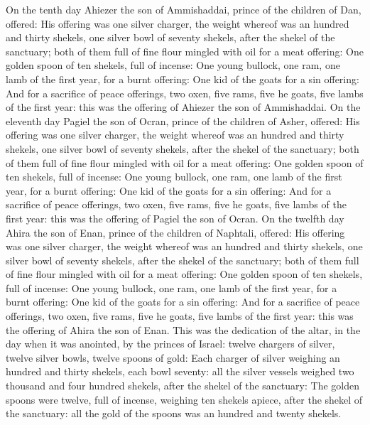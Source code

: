 \begin{biblechapter}
\verse On the tenth day Ahiezer the son of Ammishaddai, prince of the children of Dan, offered:
\verse His offering was one silver charger, the weight whereof was an hundred and thirty shekels, one silver bowl of seventy shekels, after the shekel of the sanctuary; both of them full of fine flour mingled with oil for a meat offering:
\verse One golden spoon of ten shekels, full of incense:
\verse One young bullock, one ram, one lamb of the first year, for a burnt offering:
\verse One kid of the goats for a sin offering:
\verse And for a sacrifice of peace offerings, two oxen, five rams, five he goats, five lambs of the first year: this was the offering of Ahiezer the son of Ammishaddai.
\verse On the eleventh day Pagiel the son of Ocran, prince of the children of Asher, offered:
\verse His offering was one silver charger, the weight whereof was an hundred and thirty shekels, one silver bowl of seventy shekels, after the shekel of the sanctuary; both of them full of fine flour mingled with oil for a meat offering:
\verse One golden spoon of ten shekels, full of incense:
\verse One young bullock, one ram, one lamb of the first year, for a burnt offering:
\verse One kid of the goats for a sin offering:
\verse And for a sacrifice of peace offerings, two oxen, five rams, five he goats, five lambs of the first year: this was the offering of Pagiel the son of Ocran.
\verse On the twelfth day Ahira the son of Enan, prince of the children of Naphtali, offered:
\verse His offering was one silver charger, the weight whereof was an hundred and thirty shekels, one silver bowl of seventy shekels, after the shekel of the sanctuary; both of them full of fine flour mingled with oil for a meat offering:
\verse One golden spoon of ten shekels, full of incense:
\verse One young bullock, one ram, one lamb of the first year, for a burnt offering:
\verse One kid of the goats for a sin offering:
\verse And for a sacrifice of peace offerings, two oxen, five rams, five he goats, five lambs of the first year: this was the offering of Ahira the son of Enan.
\verse This was the dedication of the altar, in the day when it was anointed, by the princes of Israel: twelve chargers of silver, twelve silver bowls, twelve spoons of gold:
\verse Each charger of silver weighing an hundred and thirty shekels, each bowl seventy: all the silver vessels weighed two thousand and four hundred shekels, after the shekel of the sanctuary:
\verse The golden spoons were twelve, full of incense, weighing ten shekels apiece, after the shekel of the sanctuary: all the gold of the spoons was an hundred and twenty shekels.

\end{biblechapter}
